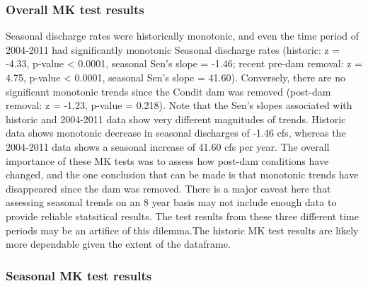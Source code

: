 \documentclass[
  12pt,
]{article}
\begin{document}
\hypertarget{overall-mk-test-results}{%
\subsubsection{Overall MK test results}\label{overall-mk-test-results}}

Seasonal discharge rates were historically monotonic, and even the time
period of 2004-2011 had significantly monotonic Seasonal discharge rates
(historic: z = -4.33, p-value \textless{} 0.0001, seasonal Sen's slope =
-1.46; recent pre-dam removal: z = 4.75, p-value \textless{} 0.0001,
seasonal Sen's slope = 41.60). Conversely, there are no significant
monotonic trends since the Condit dam was removed (post-dam removal: z =
-1.23, p-value = 0.218). Note that the Sen's slopes associated with
historic and 2004-2011 data show very different magnitudes of trends.
Historic data shows monotonic decrease in seasonal discharges of -1.46
cfs, whereas the 2004-2011 data shows a seasonal increase of 41.60 cfs
per year. The overall importance of these MK tests was to assess how
post-dam conditions have changed, and the one conclusion that can be
made is that monotonic trends have disappeared since the dam was
removed. There is a major caveat here that assessing seasonal trends on
an 8 year basis may not include enough data to provide reliable
statsitical results. The test results from these three different time
periods may be an artifice of this dilemma.The historic MK test results
are likely more dependable given the extent of the dataframe.

\hypertarget{seasonal-mk-test-results}{%
\subsubsection{Seasonal MK test
results}\label{seasonal-mk-test-results}}
\end{document}
